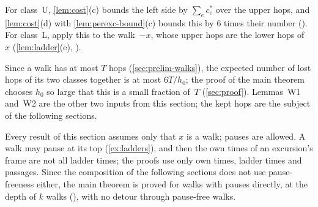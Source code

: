 \begin{outline}
For class~U, \cref{lem:cost}(c) bounds the left side by $\sum_ec^*_e$ over the upper hops, and \cref{lem:cost}(d) with
\cref{lem:perexc-bound}(c) bounds this by $6$ times their number (). For class~L, apply this to the walk~$-x$,
whose upper hops are the lower hops of~$x$ (\cref{lem:ladder}(e), ).
\end{outline}

Since a walk has at most $T$ hops (\cref{sec:prelim-walks}), the expected number of lost hops of its two classes together is at
most $6T/h_0$; the proof of the main theorem chooses $h_0$ so large that this is a small fraction of~$T$ (\cref{sec:proof}).
Lemmas~W1 and~W2 are the other two inputs from this section; the kept hops are the subject of the following sections.

\begin{remark}\label{rem:A-pauses}
Every result of this section assumes only that $x$ is a walk; pauses are allowed. A walk may pause at its top
(\cref{ex:ladders}), and then the own times of an excursion's frame are not all ladder times; the proofs use only own times,
ladder times and passages. Since the composition of the following sections does not use pause-freeness either, the main theorem
is proved for walks with pauses directly, at the depth of $k$ walks (), with no detour through pause-free
walks.
\end{remark}
